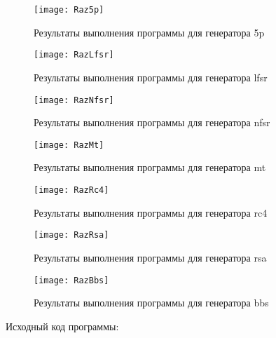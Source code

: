 \documentclass[bachelor, och, coursework]{shiza}
\begin{document}
	\begin{figure}[H]
		\centering
		\texttt{[image: Raz5p]}
		\caption{Результаты выполнения программы для генератора 5p}
		\label{fig:Raz5p}
	\end{figure}	
	
	\begin{figure}[H]
		\centering
		\texttt{[image: RazLfsr]}
		\caption{Результаты выполнения программы для генератора lfsr}
		\label{fig:RazLfsr}
	\end{figure}
	
	\begin{figure}[H]
		\centering
		\texttt{[image: RazNfsr]}
		\caption{Результаты выполнения программы для генератора nfsr}
		\label{fig:RazNfsr}
	\end{figure}
	
	\begin{figure}[H]
		\centering
		\texttt{[image: RazMt]}
		\caption{Результаты выполнения программы для генератора mt}
		\label{fig:RazMt}
	\end{figure}		
	
	\begin{figure}[H]
		\centering
		\texttt{[image: RazRc4]}
		\caption{Результаты выполнения программы для генератора rc4}
		\label{fig:RazRc4}
	\end{figure}
	
	\begin{figure}[H]
		\centering
		\texttt{[image: RazRsa]}
		\caption{Результаты выполнения программы для генератора rsa}
		\label{fig:RazRsa}
	\end{figure}
	
	\begin{figure}[H]
		\centering
		\texttt{[image: RazBbs]}
		\caption{Результаты выполнения программы для генератора bbs}
		\label{fig:RazBbs}
	\end{figure}
	
	Исходный код программы:
	
\end{document}
